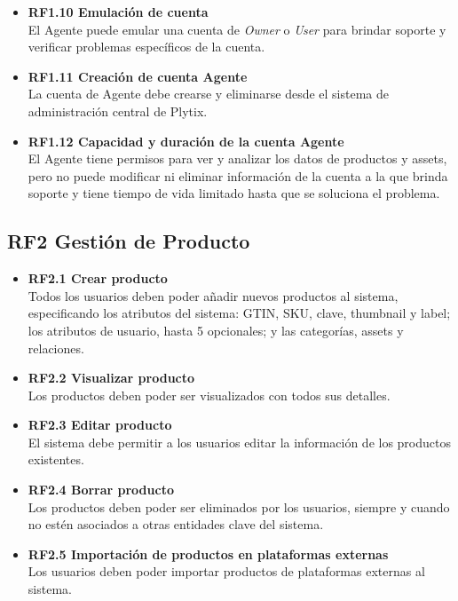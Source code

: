 \documentclass[12pt.a4paper]{article}
\begin{document}
\begin{itemize}
    \item \textbf{RF1.10 Emulación de cuenta} \\
    El Agente puede emular una cuenta de  \textit{Owner} o  \textit{User} para brindar soporte y verificar problemas específicos de la cuenta.

    \item \textbf{RF1.11 Creación de cuenta Agente} \\
    La cuenta de Agente debe crearse y eliminarse desde el sistema de administración central de Plytix.


    \item \textbf{RF1.12 Capacidad y duración de la cuenta Agente} \\
    El Agente tiene permisos para ver y analizar los datos de productos y assets, pero no puede modificar ni eliminar información de la cuenta a la que brinda soporte y tiene tiempo de vida limitado hasta que se soluciona el problema.
\end{itemize}

\subsection*{RF2 Gestión de Producto}

\begin{itemize}
    \item \textbf{RF2.1 Crear producto} \\
    Todos los usuarios deben poder añadir nuevos productos al sistema, especificando los atributos del sistema: GTIN, SKU, clave, thumbnail y label; los atributos de usuario, hasta 5 opcionales; y las categorías, assets y relaciones.

    \item \textbf{RF2.2 Visualizar producto} \\
    Los productos deben poder ser visualizados con todos sus detalles.

    \item \textbf{RF2.3 Editar producto} \\
    El sistema debe permitir a los usuarios editar la información de los productos existentes.

    \item \textbf{RF2.4 Borrar producto} \\
    Los productos deben poder ser eliminados por los usuarios, siempre y cuando no estén asociados a otras entidades clave del sistema.

    \item \textbf{RF2.5 Importación de productos en plataformas externas} \\
    Los usuarios deben poder importar productos de plataformas externas al sistema.
\end{itemize}
\end{document}
